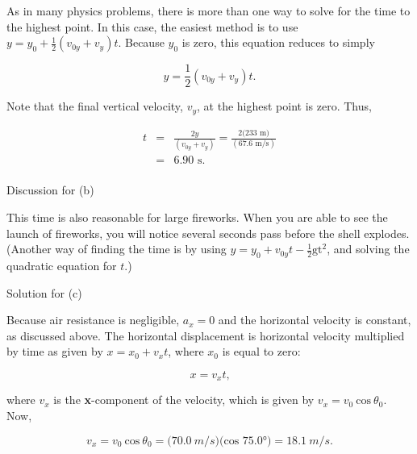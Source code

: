 \documentclass[
]{book}
\newenvironment{tinysection}{}{}
\begin{document}
As in many physics problems, there is more than one way to solve for the
time to the highest point. In this case, the easiest method is to use
\({{y = {y_{0} + \frac{1}{2}}}({v_{0y} + v_{y}})t}{}\). Because \(y_{0}{}\)
is zero, this equation reduces to simply

\leavevmode\hypertarget{eip-383}{}%
\[{{y = \frac{1}{2}}({v_{0y} + v_{y}})t}\text{.}{}\]

Note that the final vertical velocity, \(v_{y}{}\), at the highest point
is zero. Thus,

\leavevmode\hypertarget{eip-50}{}%
\[\begin{array}{lll}
t & = & {\frac{2y}{({v_{0y} + v_{y}})} = \frac{{2(\text{233\ m}})}{(\text{67.6\ m/s})}} \\
 & = & {\text{6.90\ s}\text{.}} \\
\end{array}{}\]

\begin{tinysection}

{Discussion for (b)}

\end{tinysection}

This time is also reasonable for large fireworks. When you are able to
see the launch of fireworks, you will notice several seconds pass before
the shell explodes. (Another way of finding the time is by using
\({{y = {y_{0} + v_{0y}}}{t - \frac{1}{2}}\text{gt}^{2}}{}\), and solving
the quadratic equation for \(t{}\).)

\begin{tinysection}

{Solution for (c)}

\end{tinysection}

Because air resistance is negligible, \({a_{x} = 0}{}\) and the horizontal
velocity is constant, as discussed above. The horizontal displacement is
horizontal velocity multiplied by time as given by
\({{x = {x_{0} + v_{x}}}t}{}\), where \(x_{0}{}\) is equal to zero:

\leavevmode\hypertarget{eip-675}{}%
\[{{x = v_{x}}t\text{,}}{}\]

where \(v_{x}{}\) is the \textbf{x}-component of the velocity, which is given
by \({{v_{x} = v_{0}}\ \text{cos}\ \theta_{0}\text{.}}{}\) Now,

\leavevmode\hypertarget{eip-884}{}%
\[{{v_{x} = v_{0}}\ \text{cos}\ {\theta_{0} = (}\text{70}\text{.}0\ m/s)(\text{cos\ 75.0°}{) = \text{18}}\text{.}1\ m/s.}{}\]
\end{document}
